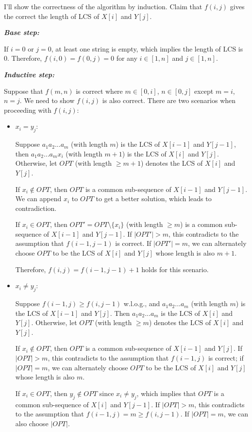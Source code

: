 \documentclass{oxmathproblems}
\begin{document}
\begin{questions}
\begin{Solution}
I'll show the correctness of the algorithm by induction. Claim that $f(i,j)$ gives the correct the length of LCS of $X[i]$ and $Y[j]$.

\textbf{\textit{Base step:}}

If $i=0$ or $j=0$, at least one string is empty, which implies the length of LCS is 0. Therefore, $f(i,0)=f(0,j)=0$ for any $i\in[1,n]$ and $j\in[1,n]$.

\textbf{\textit{Inductive step:}}

Suppose that $f(m,n)$ is correct where $m\in[0,i]$, $n\in[0,j]$ except $m=i$, $n=j$. We need to show $f(i,j)$ is also correct. There are two scenarios when proceeding with $f(i,j)$:

\begin{itemize}
    \item $x_i=y_j$: 
    
    Suppose $a_1a_2...a_m$ (with length $m$) is the LCS of $X[i-1]$ and $Y[j-1]$, then $a_1a_2...a_mx_i$ (with length $m+1$) is the LCS of $X[i]$ and $Y[j]$. Otherwise, let $OPT$ (with length $\ge m+1$) denotes the LCS of $X[i]$ and $Y[j]$. 
    
    If $x_i\notin OPT$, then $OPT$ is a common sub-sequence of $X[i-1]$ and $Y[j-1]$. We can append $x_i$ to $OPT$ to get a better solution, which leads to contradiction. 
    
    If $x_i\in OPT$, then $OPT'=OPT\setminus\{x_i\}$ (with length $\ge m$) is a common sub-sequence of $X[i-1]$ and $Y[j-1]$. If $|OPT'|>m$, this contradicts to the assumption that $f(i-1, j-1)$ is correct. If $|OPT'|=m$, we can alternately choose $OPT$ to be the LCS of $X[i]$ and $Y[j]$ whose length is also $m+1$.

    Therefore, $f(i, j)=f(i-1,j-1)+1$ holds for this scenario. 

    \item $x_i\neq y_j$: 
    
    Suppose $f(i-1, j)\ge f(i, j-1)$ w.l.o.g., and $a_1a_2...a_m$ (with length $m$) is the LCS of $X[i-1]$ and $Y[j]$. Then $a_1a_2...a_m$ is the LCS of $X[i]$ and $Y[j]$. Otherwise, let $OPT$ (with length $\ge m$) denotes the LCS of $X[i]$ and $Y[j]$.

    If $x_i\notin OPT$, then $OPT$ is a common sub-sequence of $X[i-1]$ and $Y[j]$. If $|OPT|>m$, this contradicts to the assumption that $f(i-1,j)$ is correct; if $|OPT|=m$, we can alternately choose $OPT$ to be the LCS of $X[i]$ and $Y[j]$ whose length is also $m$.

    If $x_i\in OPT$, then $y_j\notin OPT$ since $x_i\neq y_j$, which implies that $OPT$ is a common sub-sequence of $X[i]$ and $Y[j-1]$. If $|OPT|>m$, this contradicts to the assumption that $f(i-1, j)=m\ge f(i, j-1)$. If $|OPT|=m$, we can also choose $|OPT|$.


\end{itemize}
\end{Solution}
\end{questions}
\end{document}

